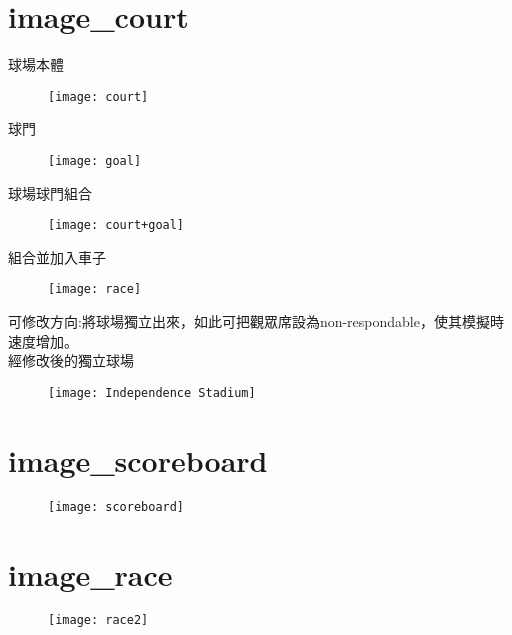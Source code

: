 \section{image\_court}
{球場本體\\
\begin{figure}
\texttt{[image: court]}
\end{figure}}
{球門\\
\begin{figure}
\texttt{[image: goal]}
\end{figure}}
{球場球門組合\\
\begin{figure}
\texttt{[image: court+goal]}
\end{figure}}
{組合並加入車子\\
\begin{figure}
\texttt{[image: race]}
\end{figure}}
{可修改方向:將球場獨立出來，如此可把觀眾席設為non-respondable，使其模擬時速度增加。\\
經修改後的獨立球場\\
\begin{figure}
\texttt{[image: Independence Stadium]}
\end{figure}}
\section{image\_scoreboard}
\begin{figure}
\texttt{[image: scoreboard]}
\end{figure}
\section{image\_race}
\begin{figure}
\texttt{[image: race2]}
\end{figure}


